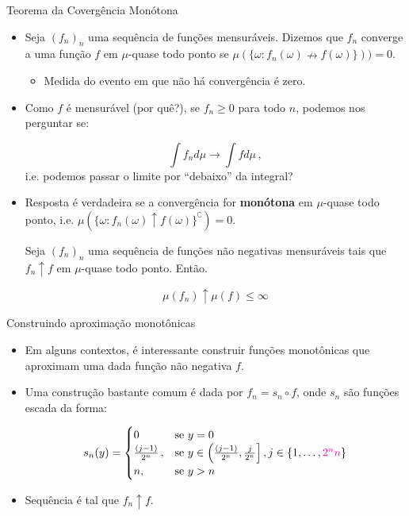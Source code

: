 \documentclass[11pt]{beamer}
\begin{document}
	\begin{frame}{Teorema da Covergência Monótona}
		\begin{itemize}
	\item Seja $(f_n)_n$ uma sequência de funções mensuráveis. Dizemos que $f_n$ converge a uma função $f$ em $\mu$-quase todo ponto se $\mu(\{\omega: f_n(\omega) \nrightarrow f(\omega)\})) = 0$.
	\begin{itemize}
		\item Medida do evento em que não há convergência é zero.
	\end{itemize}
	\item 	Como $f$  é mensurável (por quê?),  se $f_n \geq 0$ para todo $n$, podemos nos perguntar se:
	
	$$\int f_n d \mu \to \int f d \mu\, ,$$
	i.e. podemos passar o limite por ``debaixo'' da integral?
	\item Resposta é verdadeira se a convergência for \textbf{monótona}  em $\mu$-quase todo ponto, i.e. $\mu(\{\omega: f_n(\omega) \uparrow f(\omega)\}^\complement) = 0$.
	\begin{theorem}
		Seja $(f_n)_n$ uma sequência de funções não negativas mensuráveis tais que $f_n \uparrow f$ em $\mu$-quase todo ponto. Então.
		
		$$\mu(f_n) \uparrow \mu(f)\leq \infty$$
	\end{theorem}
	\end{itemize}
	\end{frame}
	
	\begin{frame}{Construindo aproximação monotônicas}
\begin{itemize}
	\item Em alguns contextos, é interessante construir funções monotônicas que aproximam uma dada função não negativa $f$. 
	\item Uma construção bastante comum é dada por $f_n = s_n \circ f$, onde $s_n$ são funções escada da forma:
	
	$$s_n(y) = \begin{cases}
		0 & \text{se } y = 0\\
		\frac{(j-1)}{2^n}\,, &  \text{se } y \in \left(	\frac{(j-1)}{2^n} , 	\frac{j }{2^n}\right], j \in \{1,\ldots, {\color{magenta}2^n n}\} \\
		n, & \text{se } y > n
	\end{cases}$$
	\item Sequência é tal que $f_n \uparrow f$.
\end{itemize}

	\end{frame}
	
\end{document}
